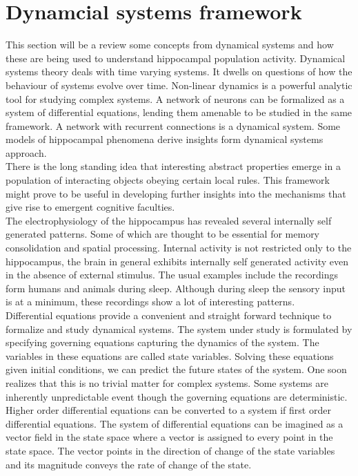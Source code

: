 
\section{Dynamcial systems framework}
\label{dynamics}



This section will be a review some concepts from dynamical systems and how these are being used to understand hippocampal population activity. Dynamical systems theory deals with time varying systems. It dwells on questions of how the behaviour of systems evolve over time. Non-linear dynamics is a powerful analytic tool for studying complex systems. A network of neurons can be formalized as a system of differential equations, lending them amenable to be studied in the same framework. A network with recurrent connections is a dynamical system. Some models of hippocampal phenomena derive insights form dynamical systems approach. \\
There is the long standing idea that interesting abstract properties emerge in a population of interacting objects obeying certain local rules. This framework might prove to be useful in developing further insights into the mechanisms that give rise to emergent cognitive faculties.\\
The electrophysiology of the hippocampus has revealed several internally self generated patterns. Some of which are thought to be essential for memory consolidation and spatial processing. Internal activity is not restricted only to the hippocampus, the brain in general exhibits internally self generated activity even in the absence of external stimulus. The usual examples include the recordings form humans and animals during sleep. Although during sleep the sensory input is at a minimum, these recordings show a lot of interesting patterns.\\
Differential equations provide a convenient and straight forward technique to formalize and study dynamical systems. The system under study is formulated by specifying governing equations capturing the dynamics of the system. The variables in these equations are called state variables. Solving these equations given initial conditions, we can predict the future states of the system. One soon realizes that this is no trivial matter for complex systems. Some systems are inherently unpredictable event though the governing equations are deterministic. Higher order differential equations can be converted to a system if first order differential equations. The system of differential equations can be imagined as a vector field in the state space where a vector is assigned to every point in the state space. The vector points in the direction of change of the state variables and its magnitude conveys the rate of change of the state. 
 
